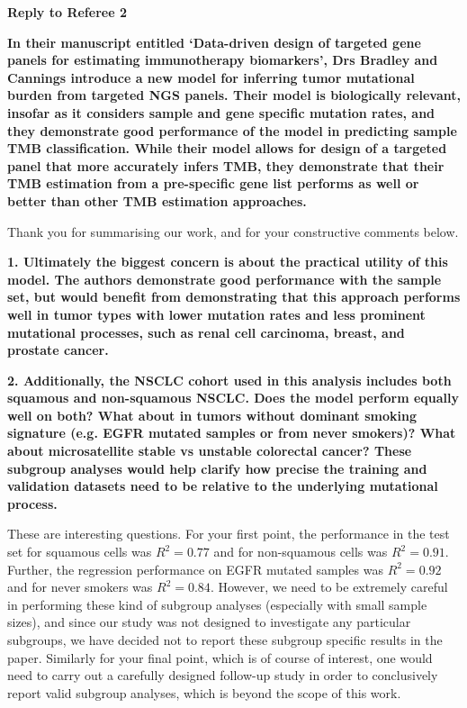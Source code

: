 \documentclass[12pt]{article}
\begin{document}
\clearpage

{\large \textbf{Reply to Referee 2}}

\textbf{In their manuscript entitled ‘Data-driven design of targeted gene panels for estimating immunotherapy biomarkers’, Drs Bradley and Cannings introduce a new model for inferring tumor mutational burden from targeted NGS panels. Their model is biologically relevant, insofar as it considers sample and gene specific mutation rates, and they demonstrate good performance of the model in predicting sample TMB classification. While their model allows for design of a targeted panel that more accurately infers TMB, they demonstrate that their TMB estimation from a pre-specific gene list performs as well or better than other TMB estimation approaches.}

Thank you for summarising our work, and for your constructive comments below. 

\textbf{1. Ultimately the biggest concern is about the practical utility of this model. The authors demonstrate good performance with the sample set, but would benefit from demonstrating that this approach performs well in tumor types with lower mutation rates and less prominent mutational processes, such as renal cell carcinoma, breast, and prostate cancer.}


\textbf{2. Additionally, the NSCLC cohort used in this analysis includes both squamous and non-squamous NSCLC. Does the model perform equally well on both? What about in tumors without dominant smoking signature (e.g. EGFR mutated samples or from never smokers)? What about microsatellite stable vs unstable colorectal cancer? These subgroup analyses would help clarify how precise the training and validation datasets need to be relative to the underlying mutational process. }


These are interesting questions.  For your first point, the performance in the test set for squamous cells was $R^2 = 0.77$ and for non-squamous cells was $R^2 = 0.91$. Further, the regression performance on EGFR mutated samples was $R^2 = 0.92$ and for never smokers was $R^2 = 0.84$.  However, we need to be extremely careful in performing these kind of subgroup analyses (especially with small sample sizes), and since our study was not designed to investigate any particular subgroups, we have decided not to report these subgroup specific results in the paper.  Similarly for your final point, which is of course of interest, one would need to carry out a carefully designed follow-up study in order to conclusively report valid subgroup analyses, which is beyond the scope of this work.  
\end{document}

